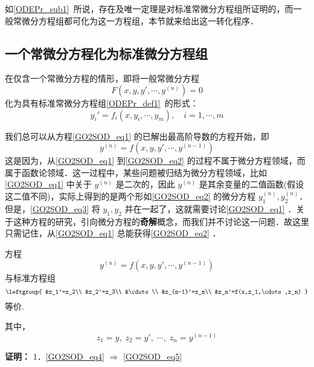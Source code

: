 
如\autoref{ODEPr_sub1}~所说，存在及唯一定理是对标准常微分方程组所证明的，而一般常微分方程组都可化为这一方程组，本节就来给出这一转化程序．

\subsection{一个常微分方程化为标准微分方程组}
在仅含一个常微分方程的情形，即将一般常微分方程
\begin{equation}\label{GO2SOD_eq1}
F(x,y,y',\cdots,y^{(n)})=0
\end{equation}
化为具有标准常微分方程组\autoref{ODEPr_def1}~的形式：
\begin{equation}\label{GO2SOD_eq3}
y_i'=f_i(x,y_i,\cdots,y_m),\quad i=1,\cdots,m
\end{equation}

我们总可以从方程\autoref{GO2SOD_eq1} 的已解出最高阶导数的方程开始，即
\begin{equation}\label{GO2SOD_eq2}
y^{(n)}=f(x,y,y',\cdots,y^{(n-1)})
\end{equation}
这是因为，从\autoref{GO2SOD_eq1} 到\autoref{GO2SOD_eq2} 的过程不属于微分方程领域，而属于函数论领域．这一过程中，某些问题被归结为微分方程领域，比如\autoref{GO2SOD_eq1} 中关于 $y^{(n)}$ 是二次的，因此 $y^{(n)}$ 是其余变量的二值函数(假设这二值不同)，实际上得到的是两个形如\autoref{GO2SOD_eq2} 的微分方程 $y_1^{(n)},y_2^{(n)}$．但是，\autoref{GO2SOD_eq3} 将 $y_1,y_2$ 并在一起了，这就需要讨论\autoref{GO2SOD_eq1} ．关于这种方程的研究，引向微分方程的\textbf{奇解}概念，而我们并不讨论这一问题．故这里只需记住，从\autoref{GO2SOD_eq1} 总能获得\autoref{GO2SOD_eq2} ．
\begin{theorem}{}
方程
\begin{equation}\label{GO2SOD_eq4}
y^{(n)}=f(x,y,y',\cdots,y^{(n-1)})
\end{equation}
与标准方程组
\begin{equation}\label{GO2SOD_eq5}
\leftgroup{
&z_1'=z_2\\
&z_2'=z_3\\
&\cdots\\
&z_{n-1}'=z_n\\
&z_n'=f(x,z_1,\cdots,z_n)
}
\end{equation}
等价.

其中，
\begin{equation}\label{GO2SOD_eq6}
z_1=y,\;z_2=y',\;\cdots,\;z_n=y^{(n-1)}
\end{equation}
\end{theorem}
\textbf{证明：}
1．\autoref{GO2SOD_eq4} $\Rightarrow$ \autoref{GO2SOD_eq5} 

